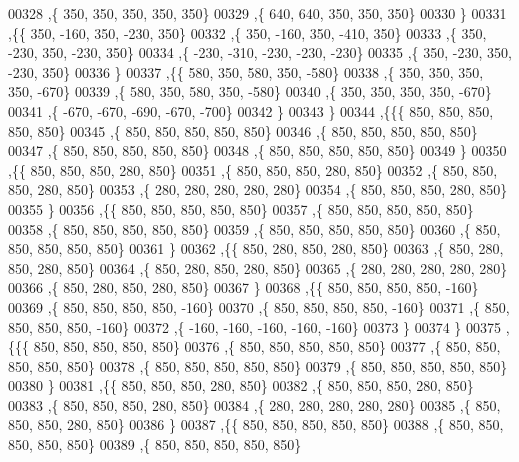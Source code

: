 \begin{DoxyCode}
00328    ,\{   350,   350,   350,   350,   350\}
00329    ,\{   640,   640,   350,   350,   350\}
00330    \}
00331   ,\{\{   350,  -160,   350,  -230,   350\}
00332    ,\{   350,  -160,   350,  -410,   350\}
00333    ,\{   350,  -230,   350,  -230,   350\}
00334    ,\{  -230,  -310,  -230,  -230,  -230\}
00335    ,\{   350,  -230,   350,  -230,   350\}
00336    \}
00337   ,\{\{   580,   350,   580,   350,  -580\}
00338    ,\{   350,   350,   350,   350,  -670\}
00339    ,\{   580,   350,   580,   350,  -580\}
00340    ,\{   350,   350,   350,   350,  -670\}
00341    ,\{  -670,  -670,  -690,  -670,  -700\}
00342    \}
00343   \}
00344  ,\{\{\{   850,   850,   850,   850,   850\}
00345    ,\{   850,   850,   850,   850,   850\}
00346    ,\{   850,   850,   850,   850,   850\}
00347    ,\{   850,   850,   850,   850,   850\}
00348    ,\{   850,   850,   850,   850,   850\}
00349    \}
00350   ,\{\{   850,   850,   850,   280,   850\}
00351    ,\{   850,   850,   850,   280,   850\}
00352    ,\{   850,   850,   850,   280,   850\}
00353    ,\{   280,   280,   280,   280,   280\}
00354    ,\{   850,   850,   850,   280,   850\}
00355    \}
00356   ,\{\{   850,   850,   850,   850,   850\}
00357    ,\{   850,   850,   850,   850,   850\}
00358    ,\{   850,   850,   850,   850,   850\}
00359    ,\{   850,   850,   850,   850,   850\}
00360    ,\{   850,   850,   850,   850,   850\}
00361    \}
00362   ,\{\{   850,   280,   850,   280,   850\}
00363    ,\{   850,   280,   850,   280,   850\}
00364    ,\{   850,   280,   850,   280,   850\}
00365    ,\{   280,   280,   280,   280,   280\}
00366    ,\{   850,   280,   850,   280,   850\}
00367    \}
00368   ,\{\{   850,   850,   850,   850,  -160\}
00369    ,\{   850,   850,   850,   850,  -160\}
00370    ,\{   850,   850,   850,   850,  -160\}
00371    ,\{   850,   850,   850,   850,  -160\}
00372    ,\{  -160,  -160,  -160,  -160,  -160\}
00373    \}
00374   \}
00375  ,\{\{\{   850,   850,   850,   850,   850\}
00376    ,\{   850,   850,   850,   850,   850\}
00377    ,\{   850,   850,   850,   850,   850\}
00378    ,\{   850,   850,   850,   850,   850\}
00379    ,\{   850,   850,   850,   850,   850\}
00380    \}
00381   ,\{\{   850,   850,   850,   280,   850\}
00382    ,\{   850,   850,   850,   280,   850\}
00383    ,\{   850,   850,   850,   280,   850\}
00384    ,\{   280,   280,   280,   280,   280\}
00385    ,\{   850,   850,   850,   280,   850\}
00386    \}
00387   ,\{\{   850,   850,   850,   850,   850\}
00388    ,\{   850,   850,   850,   850,   850\}
00389    ,\{   850,   850,   850,   850,   850\}

\end{DoxyCode}
